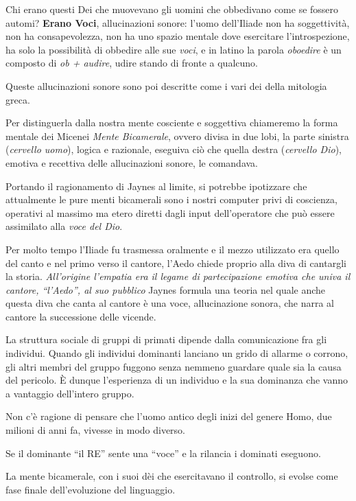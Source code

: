 Chi erano questi Dei che muovevano gli uomini che obbedivano come se fossero
automi? \textbf{Erano Voci}, allucinazioni sonore: l’uomo dell’Iliade non ha soggettività,
non ha consapevolezza, non ha uno spazio mentale dove esercitare l’introspezione,
ha solo la possibilità di obbedire alle sue \emph{voci}, e in latino la parola
\emph{oboedire} è un composto di \emph{ob + audire}, udire stando di fronte a
qualcuno.

Queste allucinazioni sonore sono poi descritte come i vari dei della mitologia
greca.

Per distinguerla dalla nostra mente cosciente e soggettiva chiameremo la forma
mentale dei Micenei \emph{Mente Bicamerale}, ovvero divisa in due lobi, la
parte sinistra (\emph{cervello uomo}), logica e razionale, eseguiva ciò che
quella destra (\emph{cervello Dio}), emotiva e recettiva delle allucinazioni
sonore, le comandava.

Portando il ragionamento di Jaynes al limite, si potrebbe ipotizzare che
attualmente le pure menti bicamerali sono i nostri computer privi di coscienza,
operativi al massimo ma etero diretti dagli input dell’operatore che può essere
assimilato alla \emph{voce del Dio}.

Per molto tempo l’Iliade fu trasmessa oralmente e il mezzo utilizzato era quello
del canto e nel primo verso il cantore, l’Aedo  chiede proprio alla diva di
cantargli la storia. \emph{All’origine l’empatia era il legame di partecipazione
emotiva che univa il cantore, “l’Aedo”, al suo pubblico} Jaynes formula una teoria
nel quale anche questa diva che canta al cantore è una voce, allucinazione
sonora, che narra al cantore la successione delle vicende.

La struttura sociale di gruppi di primati dipende dalla comunicazione fra gli
individui. Quando gli individui dominanti lanciano un grido di allarme o corrono,
gli altri membri del gruppo fuggono senza nemmeno guardare quale sia la causa
del pericolo. È dunque l'esperienza di un individuo e la sua dominanza che vanno
a vantaggio dell'intero gruppo.

Non c'è ragione di pensare che l'uomo antico degli inizi del genere Homo, due
milioni di anni fa, vivesse in modo diverso.

Se il dominante  “il RE” sente una “voce”  e la rilancia  i dominati eseguono.

La mente bicamerale, con i suoi dèi che esercitavano il controllo, si evolse
come fase finale dell'evoluzione del linguaggio.

